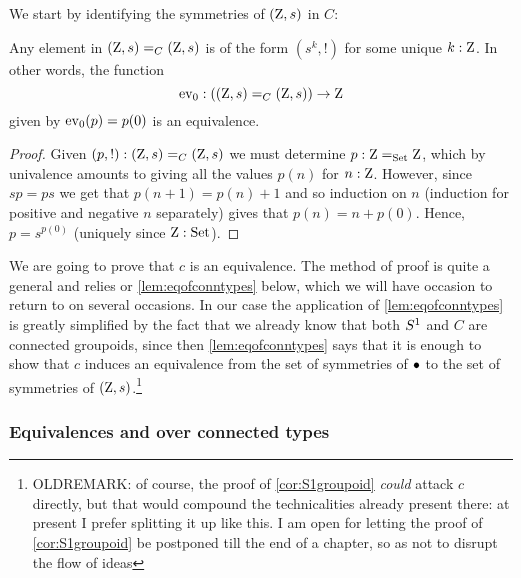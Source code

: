 We start by identifying the symmetries of $(\mathrm{Z},s)$ in $C$:

\begin{lemma}
  \label{lem:IdCisZet}
  Any element in $(\mathrm{Z},s)=_C(\mathrm{Z},s)$ is of the form $(s^k,!)$ for some unique $k:\mathrm{Z}$.  In other words,
  the function 
$$\mathrm{ev}_0:((\mathrm{Z},s)=_C(\mathrm{Z},s))\to \mathrm{Z}$$ given by $\mathrm{ev}_0(p)=p(0)$ is an equivalence.
\end{lemma}
\begin{proof}
  Given $(p,!):(\mathrm{Z},s)=_C(\mathrm{Z},s)$ we must determine $p:\mathrm{Z}=_{\mathord{\mathrm{Set}}}\mathrm{Z}$, which by univalence amounts to giving all the values $p(n)$ for $n:\mathrm{Z}$.  However, since $sp=ps$ we get that $p(n+1)=p(n)+1$ and so induction on $n$ (induction for positive and negative $n$ separately) gives that $p(n)=n+p(0)$.  Hence, $p=s^{p(0)}$ (uniquely since $\mathrm{Z}:\mathord{\mathrm{Set}}$).
\end{proof}

We are going to prove that $c$ is an equivalence.  The method of proof is quite a general and relies or  \cref{lem:eqofconntypes} below, which we will have occasion to return to on several occasions.  In our case the application of  \cref{lem:eqofconntypes} is greatly simplified by the fact that we already know that both $S^1$ and $C$ are connected groupoids, since then \cref{lem:eqofconntypes} says that it is enough to show that $c$ induces an equivalence from the set of symmetries of $\bullet$ to the set of symmetries of $(\mathrm{Z},s)$.\footnote{OLDREMARK: of course, the proof of \cref{cor:S1groupoid} \emph{could} attack $c$ directly, but that would compound the technicalities already present there: at present I prefer splitting it up like this.  I am open for letting the proof of \cref{cor:S1groupoid} be postponed till the end of a chapter, so as not to disrupt the flow of ideas}


\subsubsection{Equivalences and \coverings over connected types}
\label{sec:eqconntypes}

